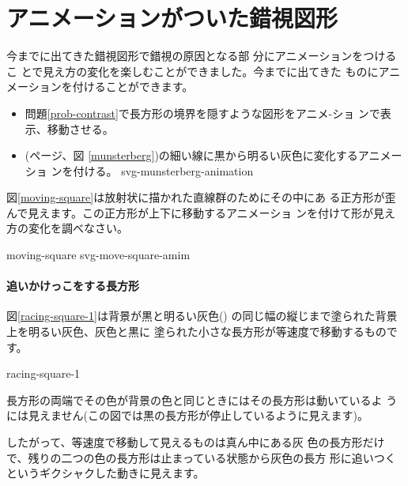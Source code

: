 \section{アニメーションがついた錯視図形}
今までに出てきた錯視図形で錯視の原因となる部
分にアニメーションをつけるこ
とで見え方の変化を楽しむことができました。今までに出てきた
ものにアニメーションを付けることができます。
\begin{itemize}\upshape
 \item 問題\ref{prob-contrast}で長方形の境界を隠すような図形をアニメ-ショ
       ンで表示、移動させる。
 \item {}(\pageref{munsterberg}ページ、図
       \ref{munsterberg})の細い線に黒から明るい灰色に変化するアニメーショ
       ンを付ける。
{svg-munsterberg-animation}
\iffalse%
 \item \OIIdxB{色の同化}(\pageref{uniform}ページ、図\ref{uniform})の細
       い斜線に色のアニメーションを付ける。
       \label{184629_5Apr08}
\fi
\end{itemize}
\begin{Problem}\upshape\label{prob-moving-square}
図\ref{moving-square}は放射状に描かれた直線群のためにその中にあ
 る正方形が歪んで見えます。この正方形が上下に移動するアニメーショ
 ンを付けて形が見え方の変化を調べなさい。
\end{Problem}
{}{moving-square}
{svg-move-square-amim}
\ \\[-3.5\baselineskip]
\paragraph{追いかけっこをする長方形}
図\ref{racing-square-1}は背景が黒と明るい灰色()
の同じ幅の縦じまで塗られた背景上を明るい灰色、灰色と黒に
塗られた小さな長方形が等速度で移動するものです。

{racing-square-1}

長方形の両端でその色が背景の色と同じときにはその長方形は動いているよ
うには見えません(この図では黒の長方形が停止しているように見えます)。

したがって、等速度で移動して見えるものは真ん中にある灰
色の長方形だけで、残りの二つの色の長方形は止まっている状態から灰色の長方
形に追いつくというギクシャクした動きに見えます。


